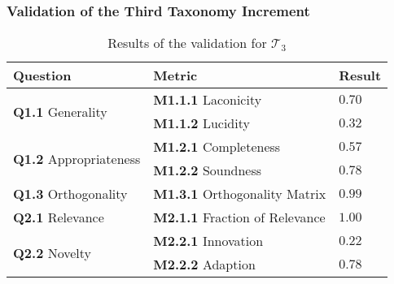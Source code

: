 \subsubsection{Validation of the Third Taxonomy Increment}

\begin{table}[t]
\centering
\begin{tabular}{@{}lll@{}}
\toprule
\textbf{Question} & \textbf{Metric} & \textbf{Result}\\ 
    \midrule
    \multirow{2}{*}{\textbf{Q1.1} Generality} & \textbf{M1.1.1} Laconicity & $0.70$ \\
    & \textbf{M1.1.2} Lucidity & $0.32$ \\ 
    
    \multirow{2}{*}{\textbf{Q1.2} Appropriateness} & \textbf{M1.2.1} Completeness & $0.57$ \\
    & \textbf{M1.2.2} Soundness & $0.78$ \\ 
    
    \textbf{Q1.3} Orthogonality & \textbf{M1.3.1} Orthogonality Matrix & $0.99$\\

    \textbf{Q2.1} Relevance & \textbf{M2.1.1} Fraction of Relevance & $1.00$ \\
    
    \multirow{2}{*}{\textbf{Q2.2} Novelty} & \textbf{M2.2.1} Innovation & $0.22$\\
    & \textbf{M2.2.2} Adaption & $0.78$\\
    \bottomrule
\end{tabular}%
\caption[Validation Results of the Third Taxonomy Increment]{Results of the validation for $\mathcal{T}_3$}
\label{tab:validation_t3}
\end{table}

